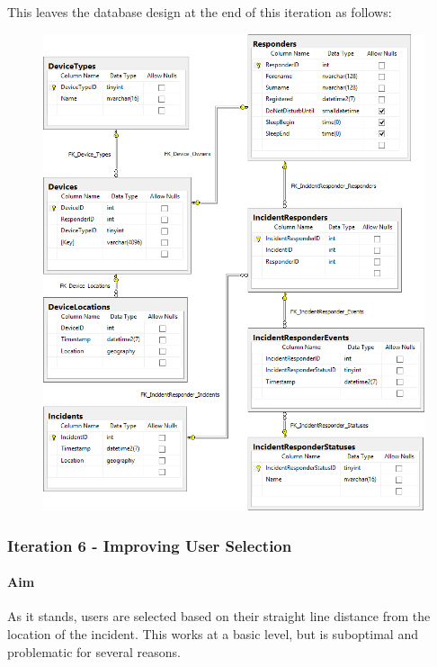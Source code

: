 \documentclass{article}
\begin{document}
\pagebreak
This leaves the database design at the end of this iteration as follows:
	\begin{figure}[H]
		\centering
		\includegraphics[width=1\textwidth]{"Iteration5/iteration-5-end"}
	\end{figure}

	
\pagebreak
		\subsubsection{Iteration 6 - Improving User Selection}
		\paragraph{Aim}
		As it stands, users are selected based on their straight line distance from the location of the incident. This works at a basic level, but is suboptimal and problematic for several reasons.
		
\end{document}
